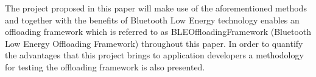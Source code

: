 
The project proposed in this paper will make use of the aforementioned methods and together with the benefits of Bluetooth Low Energy technology enables an offloading framework which is referred to as BLEOffloadingFramework  (Bluetooth Low Energy Offloading Framework) throughout this paper. In order to quantify the advantages that this project brings to application developers a methodology for testing the offloading framework is also presented.
